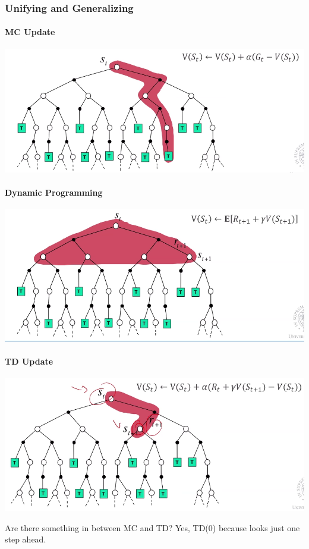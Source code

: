 \documentclass[10pt]{report}
\begin{document}
\subsubsection{Unifying and Generalizing}
\paragraph{MC Update}
\begin{center}
	\includegraphics[scale=0.5]{166.png}
\end{center}
\paragraph{Dynamic Programming}
\begin{center}
	\includegraphics[scale=0.5]{167.png}
\end{center}
\paragraph{TD Update}
\begin{center}
	\includegraphics[scale=0.5]{168.png}
\end{center}
Are there something in between MC and TD? Yes, TD(0) because looks just one step ahead.
\end{document}
